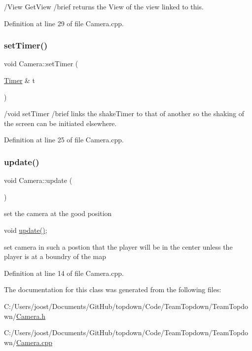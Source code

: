 /\+View Get\+View /brief returns the View of the view linked to this. 

Definition at line 29 of file Camera.\+cpp.

\mbox{\label{class_camera_aa4a2ea30c94998c0222fdffe02a499f1}} 
\subsubsection{\texorpdfstring{set\+Timer()}{setTimer()}}
{\footnotesize\ttfamily void Camera\+::set\+Timer (\begin{DoxyParamCaption}\item[{\hyperlink{struct_timer}{Timer} \&}]{t }\end{DoxyParamCaption})}

/void set\+Timer /brief links the shake\+Timer to that of another so the shaking of the screen can be initiated elsewhere. 

Definition at line 25 of file Camera.\+cpp.

\mbox{\label{class_camera_a42cda7239981a5618660d04bd5893556}} 
\subsubsection{\texorpdfstring{update()}{update()}}
{\footnotesize\ttfamily void Camera\+::update (\begin{DoxyParamCaption}{ }\end{DoxyParamCaption})}



set the camera at the good position 

void \hyperlink{class_camera_a42cda7239981a5618660d04bd5893556}{update()};

set camera in such a postion that the player will be in the center unless the player is at a boundry of the map 

Definition at line 14 of file Camera.\+cpp.



The documentation for this class was generated from the following files\+:\begin{DoxyCompactItemize}
\item 
C\+:/\+Users/joost/\+Documents/\+Git\+Hub/topdown/\+Code/\+Team\+Topdown/\+Team\+Topdown/\hyperlink{_camera_8h}{Camera.\+h}\item 
C\+:/\+Users/joost/\+Documents/\+Git\+Hub/topdown/\+Code/\+Team\+Topdown/\+Team\+Topdown/\hyperlink{_camera_8cpp}{Camera.\+cpp}\end{DoxyCompactItemize}
